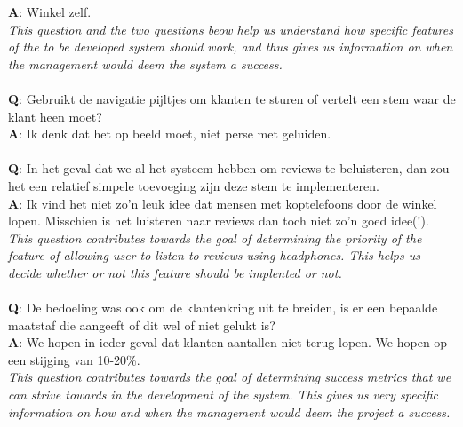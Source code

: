 \documentclass[a4paper]{article}
\begin{document}
\textbf{A}: Winkel zelf.\\
\textit{This question and the two questions beow help us understand how specific features of the to be developed system should work, and thus gives us information on when the management would deem the system a success.}\\
\\
\textbf{Q}: Gebruikt de navigatie pijltjes om klanten te sturen of vertelt een stem waar de klant heen moet?\\
\textbf{A}: Ik denk dat het op beeld moet, niet perse met geluiden. \\
\\
\textbf{Q}: In het geval dat we al het systeem hebben om reviews te beluisteren, dan zou het een relatief simpele toevoeging zijn deze stem te implementeren.\\
\textbf{A}: Ik vind het niet zo'n leuk idee dat mensen met koptelefoons door de winkel lopen. Misschien is het luisteren naar reviews dan toch niet zo'n goed idee(!).\\
\textit{This question contributes towards the goal of determining the priority of the feature of allowing user to listen to reviews using headphones. This helps us decide whether or not this feature should be implented or not.}\\
\\
\textbf{Q}: De bedoeling was ook om de klantenkring uit te breiden, is er een bepaalde maatstaf die aangeeft of dit wel of niet gelukt is?\\
\textbf{A}: We hopen in ieder geval dat klanten aantallen niet terug lopen. We hopen op een stijging van 10-20\%.\\
\textit{This question contributes towards the goal of determining success metrics that we can strive towards in the development of the system. This gives us very specific information on how and when the management would deem the project a success.}
\end{document}

